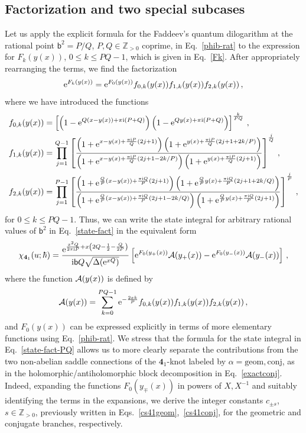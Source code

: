 \documentclass[a4paper,11pt]{article}
\theoremstyle{definition}
\newcommand{\CA}{{\cal A}}
\def\IZ{{\mathbb Z}}
\def\FE{\bm{4}_1}
\newcommand{\re}{{\rm e}}
\newcommand{\ri}{{\rm i}}
\newcommand{\mb}{{\mathsf{b}}}
\newcommand{\be}{\begin{equation}}
\newcommand{\ee}{\end{equation}}
\begin{document}
\subsection{Factorization and two special subcases}
Let us apply the explicit formula for the Faddeev's quantum dilogarithm at the rational point $\mb^2=P/Q$, $P, Q \in \IZ_{>0}$ coprime, in Eq.~\eqref{phib-rat} to the expression for $F_k(y(x))$, $0 \le k \le PQ-1$, which is given in Eq.~\eqref{Fk}. After appropriately rearranging the terms, we find the factorization
\be \label{Fk-fact}
\re^{F_k(y(x))} = \re^{F_0(y(x))} f_{0,k}(y(x)) f_{1,k}(y(x)) f_{2,k}(y(x)) \, , 
\ee 
where we have introduced the functions
\begin{subequations}
\begin{align}
f_{0,k}(y(x)) &= \left[\left( 1 - \re^{Q(x-y(x))+ \pi \ri (P+Q)} \right) \left( 1 - \re^{Q y(x)+ \pi \ri (P+Q)} \right)\right]^{\frac{k}{P Q}} \, , \\
f_{1,k}(y(x)) &=\prod_{j=1}^{Q-1} 
\left[ \frac{\left(1 + \re^{x-y(x)+ \frac{\pi \ri P}{Q}(2j+1)} \right) \left(1 + \re^{y(x)+ \frac{\pi \ri P}{Q}(2j+1+2k/P)} \right)}{\left(1 + \re^{x-y(x)+ \frac{\pi \ri P}{Q}(2j+1-2k/P)} \right) \left(1 + \re^{y(x)+ \frac{\pi \ri P}{Q}(2j+1)} \right)} \right]^{j \over Q}  \, , \\
f_{2,k}(y(x)) &=\prod_{j=1}^{P-1} 
\left[ \frac{\left(1 + \re^{\frac{Q}{P}(x-y(x))+ \frac{\pi \ri Q}{P}(2j+1)} \right) \left(1 + \re^{\frac{Q}{P} y(x)+ \frac{\pi \ri Q}{P}(2j+1+2k/Q)} \right)}{\left(1 + \re^{\frac{Q}{P}(x-y(x))+ \frac{\pi \ri Q}{P}(2j+1-2k/Q)} \right) \left(1 + \re^{\frac{Q}{P} y(x)+ \frac{\pi \ri Q}{P}(2j+1)} \right)}  \right]^{j \over P} \, ,
\end{align}
\end{subequations}
for $0 \le k \le PQ-1$. Thus, we can write the state integral for arbitrary rational values of $\mb^2$ in Eq.~\eqref{state-fact} in the equivalent form
\be \label{state-fact-PQ}
\chi_{\FE}(u;\hbar) = \frac{\re^{\frac{x^2 Q}{2 \pi \ri P}+x\left( 2 Q -\frac{1}{2}-\frac{Q}{2 P}\right)} }{\ri \mb Q \sqrt{\Delta(\re^{x Q})}} \left[\re^{F_0(y_+(x))} \CA(y_+(x)) - \re^{F_0(y_-(x))} \CA(y_-(x)) \right] \, , 
\ee
where the function $\CA(y(x))$ is defined by
\be
\CA(y(x)) = \sum_{k=0}^{P Q - 1}  \re^{-\frac{2 x k}{P}} f_{0,k}(y(x)) f_{1,k}(y(x)) f_{2,k}(y(x)) \, ,
\ee
and $F_0(y(x))$ can be expressed explicitly in terms of more elementary functions using Eq.~\eqref{phib-rat}. 
We stress that the formula for the state integral in Eq.~\eqref{state-fact-PQ} allows us to more clearly separate the contributions from the two non-abelian saddle connections of the $\FE$-knot labeled by $\alpha = \text{geom}, \text{conj}$, as in the holomorphic/antiholomorphic block decomposition in Eq.~\eqref{exactconj}. Indeed, expanding the functions $F_0(y_{\mp}(x))$ in powers of $X, X^{-1}$ and suitably identifying the terms in the expansions, we derive the integer constants $c_{\pm s}$, $s \in \IZ_{>0}$, previously written in Eqs.~\eqref{cs41geom},~\eqref{cs41conj}, for the geometric and conjugate branches, respectively.
\end{document}
